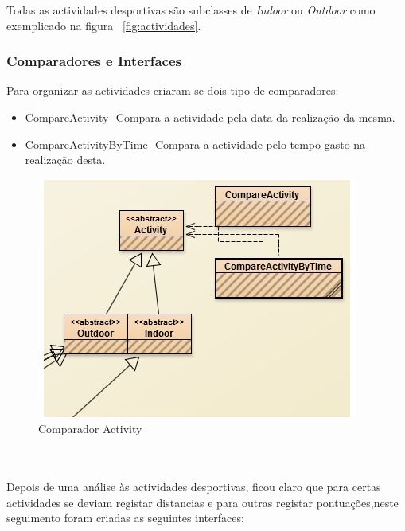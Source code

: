 \documentclass[10pt,notitlepage]{article}
\begin{document}
Todas as actividades desportivas são subclasses de \textit{Indoor} ou \textit{Outdoor} como exemplicado na figura ~\ref{fig:actividades}.

\subsubsection{Comparadores e Interfaces}
Para organizar as actividades criaram-se dois tipo de comparadores:
\begin{itemize}
\item CompareActivity- Compara a actividade pela data da realização da mesma.
\item CompareActivityByTime- Compara a actividade pelo tempo gasto na realização desta.
\end{itemize}

\begin{figure}[ht]
\centering
\includegraphics[scale=1]{ComparadorActivity.png}
\caption{Comparador Activity}
\end{figure}

~\\~\\

Depois de uma análise às actividades desportivas, ficou claro que para certas actividades se deviam registar distancias e para outras registar pontuações,neste seguimento foram criadas as seguintes interfaces:
\end{document}
